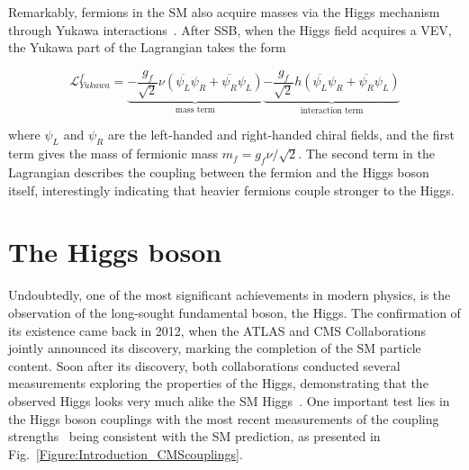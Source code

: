 Remarkably, fermions in the SM also acquire masses via the Higgs mechanism through Yukawa interactions~\cite{YukawaInteractions}. After SSB, when the Higgs field acquires a VEV, the Yukawa part of the Lagrangian takes the form

\begin{equation}
    \mathcal{L}_{Yukawa}^f = \underbrace{-\frac{g_f}{\sqrt{2}}\nu(\overline{\psi_L}\psi_R + \overline{\psi_R} \psi_L)}_{\text{mass term}} \underbrace{- \frac{g_f}{\sqrt{2}}h(\overline{\psi_L}\psi_R + \overline{\psi_R} \psi_L)}_{\text{interaction term}}
\end{equation}

where $\psi_L$ and $\psi_R$ are the left-handed and right-handed chiral fields, and the first term gives the mass of fermionic mass $m_f = g_f\nu / \sqrt{2}$. The second term in the Lagrangian describes the coupling between the fermion and the Higgs boson itself, interestingly indicating that heavier fermions couple stronger to the Higgs.

\section{The Higgs boson}

Undoubtedly, one of the most significant achievements in modern physics, is the observation of the long-sought fundamental boson, the Higgs. The confirmation of its existence came back in 2012, when the ATLAS and CMS Collaborations~\cite{Higgs_ATLAS,Higgs_CMS} jointly announced its discovery, marking the completion of the SM particle content. Soon after its discovery, both collaborations conducted several measurements exploring the properties of the Higgs, demonstrating that the observed Higgs looks very much alike the SM Higgs~\cite{HiggsParity_1,HiggsParity_2}. One important test lies in the Higgs boson couplings with the most recent measurements of the coupling strengths~\cite{CMS_Couplings_Measurement} being consistent with the SM prediction, as presented in Fig.~\ref{Figure:Introduction_CMScouplings}.

